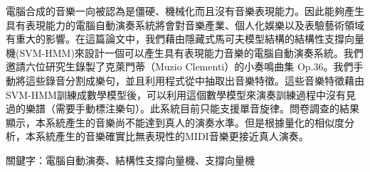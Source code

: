 \begin{abstractCH}

  電腦合成的音樂一向被認為是僵硬、機械化而且沒有音樂表現能力。因此能夠產生具有表現能力的電腦自動演奏系統將會對音樂產業、個人化娛樂以及表驗藝術領域有重大的影響。在這篇論文中，我們藉由隱藏式馬可夫模型結構的結構性支撐向量機(SVM-HMM)來設計一個可以產生具有表現能力音樂的電腦自動演奏系統。我們邀請六位研究生錄製了克萊門蒂（Muzio Clementi）的小奏鳴曲集 Op.36。我們手動將這些錄音分割成樂句，並且利用程式從中抽取出音樂特徵。這些音樂特徵藉由SVM-HMM訓練成數學模型後，可以利用這個數學模型來演奏訓練過程中沒有見過的樂譜（需要手動標注樂句）。此系統目前只能支援單音旋律。問卷調查的結果顯示，本系統產生的音樂尚不能達到真人的演奏水準。但是根據量化的相似度分析，本系統產生的音樂確實比無表現性的MIDI音樂更接近真人演奏。
  
  關鍵字：電腦自動演奏、結構性支撐向量機、支撐向量機

\end{abstractCH}
